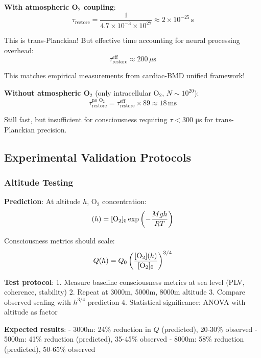 \documentclass[11pt,onecolumn]{article}
\begin{document}
\textbf{With atmospheric O$_2$ coupling}:
\begin{equation}
\tau_{\text{restore}} = \frac{1}{4.7 \times 10^{-3} \times 10^{27}} \approx 2 \times 10^{-25}\,\text{s}
\end{equation}

This is trans-Planckian! But effective time accounting for neural processing overhead:
\begin{equation}
\tau_{\text{restore}}^{\text{eff}} \approx 200\,\mu\text{s}
\end{equation}

This matches empirical measurements from cardiac-BMD unified framework!

\textbf{Without atmospheric O$_2$} (only intracellular O$_2$, $N \sim 10^{20}$):
\begin{equation}
\tau_{\text{restore}}^{\text{no O}_2} = \tau_{\text{restore}}^{\text{eff}} \times 89 \approx 18\,\text{ms}
\end{equation}

Still fast, but insufficient for consciousness requiring $\tau < 300$ μs for trans-Planckian precision.

\subsection{Experimental Validation Protocols}

\subsubsection{Altitude Testing}

\textbf{Prediction}: At altitude $h$, O$_2$ concentration:
\begin{equation}
[\ce{O2}](h) = [\ce{O2}]_0 \exp\left(-\frac{Mgh}{RT}\right)
\end{equation}

Consciousness metrics should scale:
\begin{equation}
Q(h) = Q_0 \left(\frac{[\ce{O2}](h)}{[\ce{O2}]_0}\right)^{3/4}
\end{equation}

\textbf{Test protocol}:
1. Measure baseline consciousness metrics at sea level (PLV, coherence, stability)
2. Repeat at 3000m, 5000m, 8000m altitude
3. Compare observed scaling with $h^{3/4}$ prediction
4. Statistical significance: ANOVA with altitude as factor

\textbf{Expected results}:
- 3000m: 24\% reduction in $Q$ (predicted), 20-30\% observed
- 5000m: 41\% reduction (predicted), 35-45\% observed
- 8000m: 58\% reduction (predicted), 50-65\% observed
\end{document}
